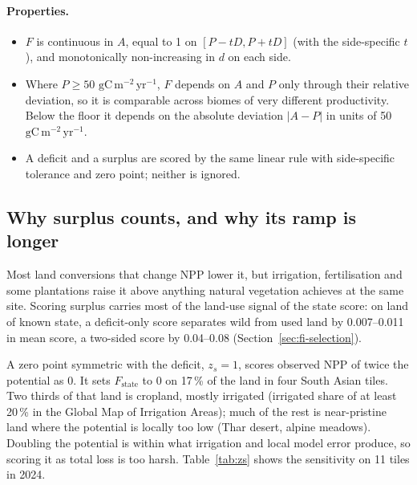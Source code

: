 \documentclass[11pt,a4paper]{article}
\newcommand{\npp}{\ensuremath{\mathrm{gC\,m^{-2}\,yr^{-1}}}}
\begin{document}
\paragraph{Properties.}
\begin{itemize}
\item $F$ is continuous in $A$, equal to 1 on $[P - tD, P + tD]$ (with the side-specific $t$), and
monotonically non-increasing in $d$ on each side.
\item Where $P \ge 50$ \npp, $F$ depends on $A$ and $P$ only through their relative deviation,
so it is comparable across biomes of very different productivity. Below the floor it depends on
the absolute deviation $|A - P|$ in units of 50 \npp.
\item A deficit and a surplus are scored by the same linear rule with side-specific tolerance
and zero point; neither is ignored.
\end{itemize}

\subsection{Why surplus counts, and why its ramp is longer}

Most land conversions that change NPP lower it, but irrigation, fertilisation and some
plantations raise it above anything natural vegetation achieves at the same site. Scoring
surplus carries most of the land-use signal of the state score: on land of known state, a
deficit-only score separates wild from used land by 0.007--0.011 in mean score, a two-sided score
by 0.04--0.08 (Section~\ref{sec:fi-selection}).

A zero point symmetric with the deficit, $z_s = 1$, scores observed NPP of twice the potential as
0. It sets $F_{\text{state}}$ to 0 on 17\,\% of the land in four South Asian tiles. Two thirds of
that land is cropland, mostly irrigated (irrigated share of at least 20\,\% in the Global Map of
Irrigation Areas); much of the rest is near-pristine land where the potential is locally too low
(Thar desert, alpine meadows). Doubling the potential is within what irrigation and local model
error produce, so scoring it as total loss is too harsh. Table~\ref{tab:zs} shows the sensitivity
on 11 tiles in 2024.
\end{document}
